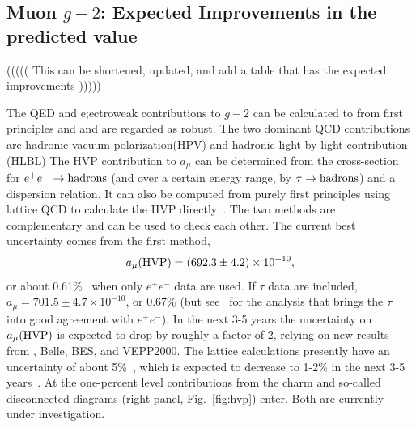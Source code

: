 \subsection{Muon $g-2$: Expected Improvements in the predicted value}\label{sec:cl:g-2exp}

((((( This can be shortened, updated, and add a table that has the expected improvements )))))


The QED and e;ectroweak contributions to $g-2$ can be calculated to from first principles and
and are regarded as robust.  The two dominant QCD contributions are hadronic vacuum polarization(HPV) and hadronic light-by-light contribution (HLBL) 
The HVP contribution to $a_\mu$ can be determined from the
cross-section for $e^+e^-\to\rm hadrons$ (and over a certain energy
range, by $\tau\to\rm hadrons$) and a dispersion relation. It can also
be computed from purely first principles using lattice QCD to
calculate the HVP directly~\cite{hep-lat/0212018}. The two methods are
complementary and can be used to check each other. The current best
uncertainty comes from the first method,
\begin{equation}
a_\mu(\rm HVP)=(692.3\pm4.2)\times 10^{-10},
\end{equation}
or about 0.61\%~\cite{arXiv:1010.4180} when only $e^+e^-$ data are used. 
If $\tau$ data are included, $a_\mu=701.5\pm4.7\times 10^{-10}$, or 0.67\% 
(but see~\cite{arXiv:1101.2872} for the analysis that brings the $\tau$ 
into good agreement with $e^+e^-$). In the next 3-5 years the uncertainty on 
$a_\mu(\rm HVP)$ is expected to drop by roughly a factor of 2, relying 
on new results from {\babar}, Belle, BES, and VEPP2000.
The lattice calculations presently have an uncertainty of 
about 5\%~\cite{hep-lat/0608011, arXiv:1103.4818, Boyle:2011hu,  DellaMorte:2011aa}, which is 
expected to decrease to 1-2\% in the next 3-5 years~\cite{USQCD}. At the 
one-percent level contributions from the charm and so-called disconnected 
diagrams (right panel, Fig.~\ref{fig:hvp}) enter. Both are currently under investigation.
%
